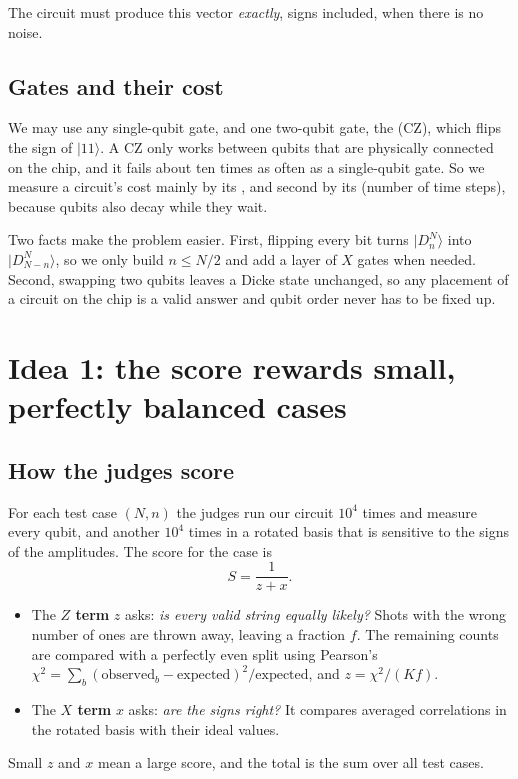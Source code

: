 \documentclass[11pt]{scrartcl}
\newcommand{\ket}[1]{\lvert #1\rangle}
\newcommand{\D}[2]{D^{#1}_{#2}}
\newcommand{\CZ}{\ensuremath{\mathrm{CZ}}}
\begin{document}
The circuit must produce this vector \emph{exactly}, signs included, when there is no noise.

\subsection{Gates and their cost}

We may use any single-qubit gate, and one two-qubit gate, the 
($\CZ$), which flips the sign of $\ket{11}$. A CZ only works between qubits that are physically
connected on the chip, and it fails about ten times as often as a single-qubit gate. So we measure a
circuit's cost mainly by its , and second by its  (number of time
steps), because qubits also decay while they wait.

Two facts make the problem easier. First, flipping every bit turns $\ket{\D Nn}$ into
$\ket{\D N{N-n}}$, so we only build $n\le N/2$ and add a layer of $X$ gates when needed. Second,
swapping two qubits leaves a Dicke state unchanged, so any placement of a circuit on the chip is a
valid answer and qubit order never has to be fixed up.

\section{Idea 1: the score rewards small, perfectly balanced cases}\label{sec:score}

\subsection{How the judges score}

For each test case $(N,n)$ the judges run our circuit $10^4$ times and measure every qubit, and
another $10^4$ times in a rotated basis that is sensitive to the signs of the amplitudes. The score
for the case is
\[
  S=\frac{1}{z+x}.
\]
\begin{itemize}
  \item The \textbf{$Z$ term} $z$ asks: \emph{is every valid string equally likely?} Shots with the
        wrong number of ones are thrown away, leaving a fraction $f$. The remaining counts are
        compared with a perfectly even split using Pearson's 
        $\chi^2=\sum_b (\text{observed}_b-\text{expected})^2/\text{expected}$, and
        $z=\chi^2/(Kf)$.
  \item The \textbf{$X$ term} $x$ asks: \emph{are the signs right?} It compares averaged
        correlations in the rotated basis with their ideal values.
\end{itemize}
Small $z$ and $x$ mean a large score, and the total is the sum over all test cases.
\end{document}
